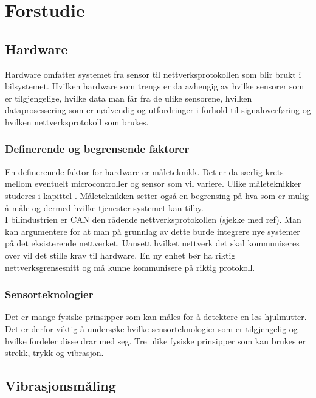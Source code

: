 \chapter{Forstudie}

\section{Hardware}

Hardware omfatter systemet fra sensor til nettverksprotokollen som blir brukt i
bilsystemet. Hvilken hardware
som trengs er da avhengig av hvilke sensorer som er tilgjengelige, hvilke data
man får fra de ulike sensorene, hvilken dataprosessering som er nødvendig og
utfordringer i forhold til signaloverføring og
hvilken nettverksprotokoll som brukes. 

\subsection{Definerende og begrensende faktorer}

En definerenede faktor for hardware er måleteknikk. Det er da særlig krets
mellom eventuelt microcontroller og sensor som vil variere. Ulike måleteknikker studeres
i kapittel . Måleteknikken setter også en begrensing på hva som er
mulig å måle og dermed hvilke tjenester systemet kan tilby. \\

I bilindustrien er CAN den rådende nettverksprotokollen (sjekke med ref). Man
kan argumentere for at man på grunnlag av dette burde integrere nye systemer på
det eksisterende nettverket. Uansett hvilket nettverk det skal kommuniseres over
vil det stille krav til hardware. En ny enhet bør ha riktig nettverksgrensesnitt
og må kunne kommunisere på riktig protokoll. 

\subsection{Sensorteknologier}

Det er mange fysiske prinsipper som kan måles for å detektere en løs hjulmutter.
Det er derfor viktig å undersøke hvilke sensorteknologier som er tilgjengelig og
hvilke fordeler disse drar med seg. Tre ulike fysiske prinsipper som kan brukes er strekk, trykk og vibrasjon. 

\section{Vibrasjonsmåling}

